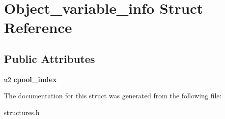 \hypertarget{structObject__variable__info}{}\section{Object\+\_\+variable\+\_\+info Struct Reference}
\label{structObject__variable__info}
\subsection*{Public Attributes}
\begin{DoxyCompactItemize}
\item 
u2 {\bfseries cpool\+\_\+index}\hypertarget{structObject__variable__info_a0588843a5e59b67c1732ed9f6b5eb5a0}{}\label{structObject__variable__info_a0588843a5e59b67c1732ed9f6b5eb5a0}

\end{DoxyCompactItemize}


The documentation for this struct was generated from the following file\+:\begin{DoxyCompactItemize}
\item 
structures.\+h\end{DoxyCompactItemize}
